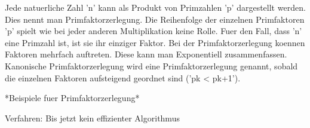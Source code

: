 Jede natuerliche Zahl 'n' kann als Produkt von Primzahlen 'p' dargestellt werden. Dies nennt man Primfaktorzerlegung. Die Reihenfolge der einzelnen Primfaktoren 'p' spielt wie bei jeder anderen Multiplikation keine Rolle. Fuer den Fall, dass 'n' eine Primzahl ist, ist sie ihr einziger Faktor. Bei der Primfaktorzerlegung koennen Faktoren mehrfach auftreten. Diese kann man Exponentiell zusammenfassen. Kanonische Primfaktorzerlegung wird eine Primfaktorzerlegung genannt, sobald die einzelnen Faktoren aufsteigend geordnet sind ('pk < pk+1').

*Beispiele fuer Primfaktorzerlegung*

Verfahren: Bis jetzt kein effizienter Algorithmus